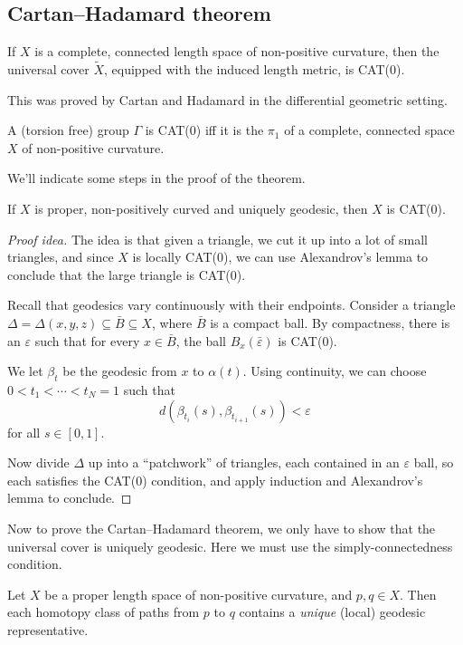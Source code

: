 \documentclass[a4paper]{article}
\begin{document}
\subsection{Cartan--Hadamard theorem}

\begin{thm}
  If $X$ is a complete, connected length space of non-positive curvature, then the universal cover $\tilde{X}$, equipped with the induced length metric, is CAT(0).
\end{thm}
This was proved by Cartan and Hadamard in the differential geometric setting.

\begin{cor}
  A (torsion free) group $\Gamma$ is CAT(0) iff it is the $\pi_1$ of a complete, connected space $X$ of non-positive curvature.
\end{cor}

We'll indicate some steps in the proof of the theorem.
\begin{lemma}
  If $X$ is proper, non-positively curved and uniquely geodesic, then $X$ is CAT(0).
\end{lemma}

\begin{proof}[Proof idea]
  The idea is that given a triangle, we cut it up into a lot of small triangles, and since $X$ is locally CAT(0), we can use Alexandrov's lemma to conclude that the large triangle is CAT(0).

  Recall that geodesics vary continuously with their endpoints. Consider a triangle $\Delta = \Delta (x, y, z) \subseteq \bar{B} \subseteq X$, where $\bar{B}$ is a compact ball. By compactness, there is an $\varepsilon$ such that for every $x \in \bar{B}$, the ball $B_x(\bar{\varepsilon})$ is CAT(0).

  We let $\beta_t$ be the geodesic from $x$ to $\alpha(t)$. Using continuity, we can choose $0 < t_1 < \cdots < t_N = 1$ such that
  \[
    d(\beta_{t_i}(s), \beta_{t_{i + 1}}(s)) < \varepsilon
  \]
  for all $s \in [0, 1]$.

  Now divide $\Delta$ up into a ``patchwork'' of triangles, each contained in an $\varepsilon$ ball, so each satisfies the CAT(0) condition, and apply induction and Alexandrov's lemma to conclude.
\end{proof}

Now to prove the Cartan--Hadamard theorem, we only have to show that the universal cover is uniquely geodesic. Here we must use the simply-connectedness condition.
\begin{thm}
  Let $X$ be a proper length space of non-positive curvature, and $p, q \in X$. Then each homotopy class of paths from $p$ to $q$ contains a \emph{unique} (local) geodesic representative.
\end{thm}
\end{document}
